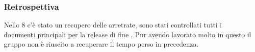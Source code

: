 \subsubsection{Retrospettiva}
\label{sec:sprint8_retrospettiva}
Nello  8 c'è stato un recupero delle  arretrate, sono stati controllati tutti
i documenti principali per la release di fine . Pur avendo lavorato molto in questo 
il gruppo non è riuscito a recuperare il tempo perso in precedenza.